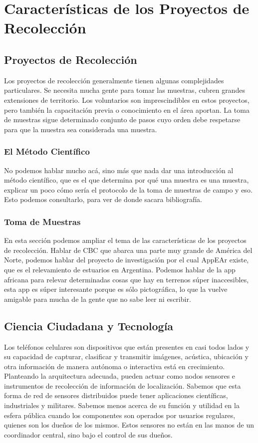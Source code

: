 \chapter{Características de los Proyectos de Recolección}

\section{Proyectos de Recolección}
Los proyectos de recolección generalmente tienen algunas complejidades particulares. Se necesita mucha gente para tomar las muestras, cubren grandes extensiones de territorio. Los voluntarios son imprescindibles en estos proyectos, pero también la capacitación previa o conocimiento en el área aportan. La toma de muestras sigue determinado conjunto de pasos cuyo orden debe respetarse para que la muestra sea considerada una muestra. 

\subsection{El Método Científico}
No podemos hablar mucho acá, sino más que nada dar una introducción al método científico, que es el que determina por qué una muestra es una muestra, explicar un poco cómo sería el protocolo de la toma de muestras de campo y eso. Esto podemos consultarlo, para ver de donde sacara bibliografía.

\subsection{Toma de Muestras}	
En esta sección podemos ampliar el tema de las características de los proyectos de recolección. Hablar de CBC que abarca una parte muy grande de América del Norte, podemos hablar del proyecto de investigación por el cual AppEAr existe, que es el relevamiento de estuarios en Argentina. Podemos hablar de la app africana para relevar determinadas cosas que hay en terrenos súper inaccesibles, esta app es súper interesante porque es sólo pictográfica, lo que la vuelve amigable para mucha de la gente que no sabe leer ni escribir. 

\section{Ciencia Ciudadana y Tecnología}

	Los teléfonos celulares son dispositivos que están presentes en casi todos lados y su capacidad de capturar, clasificar y transmitir imágenes, acústica, ubicación y otra información de manera autónoma o interactiva está en crecimiento.
Planteando la arquitectura adecuada, pueden actuar como nodos sensores e instrumentos de recolección de información de localización. 
Sabemos que esta forma de red de sensores distribuidos puede tener aplicaciones científicas, industriales y militares. Sabemos menos acerca de su función y utilidad en la esfera pública cuando los componentes son operados por usuarios regulares, quienes son los dueños de los mismos. Estos sensores no están en las manos de un coordinador central, sino bajo el control de sus dueños.

